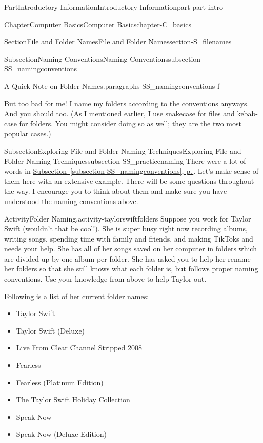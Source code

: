 \documentclass[twoside,10pt,]{book}
\newcommand{\xreffont}{\relax}
\begin{document}
\begin{partptx}{Part}{Introductory Information}{}{Introductory Information}{}{}{part-part-intro}
\begin{chapterptx}{Chapter}{Computer Basics}{}{Computer Basics}{}{}{chapter-C_basics}
\begin{sectionptx}{Section}{File and Folder Names}{}{File and Folder Names}{}{}{section-S_filenames}
\begin{subsectionptx}{Subsection}{Naming Conventions}{}{Naming Conventions}{}{}{subsection-SS_namingconventions}
\begin{paragraphs}{A Quick Note on Folder Names.}{paragraphs-SS_namingconventions-f}
\par
But too bad for me! I name my folders according to the conventions anyways. And you should too. (As I mentioned earlier, I use snake\textunderscore{}case for files and kebab-case for folders. You might consider doing so as well; they are the two most popular cases.)%
\end{paragraphs}%
\end{subsectionptx}
%
%
\typeout{************************************************}
\typeout{************************************************}
%
\begin{subsectionptx}{Subsection}{Exploring File and Folder Naming Techniques}{}{Exploring File and Folder Naming Techniques}{}{}{subsection-SS_practicenaming}
There were a lot of words in \hyperref[subsection-SS_namingconventions]{Subsection~{\xreffont\ref{subsection-SS_namingconventions}}, p.\,\pageref{subsection-SS_namingconventions}}. Let's make sense of them here with an extensive example. There will be some questions throughout the way. I encourage you to think about them and make sure you have understood the naming conventions above.%
\begin{activity}{Activity}{Folder Naming.}{activity-taylorswiftfolders}%
%
Suppose you work for Taylor Swift (wouldn't that be cool!). She is super busy right now recording albums, writing songs, spending time with family and friends, and making TikToks and needs your help. She has all of her songs saved on her computer in folders which are divided up by one album per folder. She has asked you to help her rename her folders so that she still knows what each folder is, but follows proper naming conventions. Use your knowledge from above to help Taylor out.%
\par
Following is a list of her current folder names:%
\begin{multicols}{2}
\begin{itemize}[label=\textbullet]
\item{}Taylor Swift%
\item{}Taylor Swift (Deluxe)%
\item{}Live From Clear Channel Stripped 2008%
\item{}Fearless%
\item{}Fearless (Platinum Edition)%
\item{}The Taylor Swift Holiday Collection%
\item{}Speak Now%
\item{}Speak Now (Deluxe Edition)%

\end{itemize}
\end{multicols}
\end{activity}
\end{subsectionptx}
\end{sectionptx}
\end{chapterptx}
\end{partptx}
\end{document}
